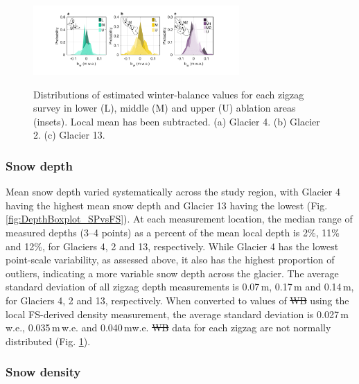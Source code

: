 \documentclass[review,oneside, letterpaper]{igs} %
\providecommand{\DIFadd}[1]{{\protect\color{blue}\uwave{#1}}} %
\providecommand{\DIFdel}[1]{{\protect\color{red}\sout{#1}}}                      %
\providecommand{\DIFaddbegin}{} %
\providecommand{\DIFaddend}{} %
\providecommand{\DIFdelbegin}{} %
\providecommand{\DIFdelend}{} %
\providecommand{\DIFaddbeginFL}{} %
\providecommand{\DIFaddendFL}{} %
\providecommand{\DIFdelbeginFL}{} %
\providecommand{\DIFdelendFL}{} %
\newcommand{\DIFscaledelfig}{0.5}
\newlength{\DIFdelgraphicswidth} %
\newlength{\DIFdelgraphicsheight} %
\newcommand{\DIFaddincludegraphics}[2][]{{\color{blue}\fbox{\DIFOincludegraphics[#1]{#2}}}} %
\newcommand{\DIFdelincludegraphics}[2][]{%
\sbox{\DIFdelgraphicsbox}{\DIFOincludegraphics[#1]{#2}}%
\settoboxwidth{\DIFdelgraphicswidth}{\DIFdelgraphicsbox} %
\settoboxtotalheight{\DIFdelgraphicsheight}{\DIFdelgraphicsbox} %
\scalebox{\DIFscaledelfig}{%
\parbox[b]{\DIFdelgraphicswidth}{\usebox{\DIFdelgraphicsbox}\\[-\baselineskip] \rule{\DIFdelgraphicswidth}{0em}}\llap{\resizebox{\DIFdelgraphicswidth}{\DIFdelgraphicsheight}{%
\setlength{\unitlength}{\DIFdelgraphicswidth}%
\begin{picture}(1,1)%
\thicklines\linethickness{2pt} %
{\color[rgb]{1,0,0}\put(0,0){\framebox(1,1){}}}%
{\color[rgb]{1,0,0}\put(0,0){\line( 1,1){1}}}%
{\color[rgb]{1,0,0}\put(0,1){\line(1,-1){1}}}%
\end{picture}%
}\hspace*{3pt}}} %
} %
\DeclareRobustCommand{\DIFaddbegin}{\DIFOaddbegin \let\includegraphics\DIFaddincludegraphics} %
\DeclareRobustCommand{\DIFaddend}{\DIFOaddend \let\includegraphics\DIFOincludegraphics} %
\DeclareRobustCommand{\DIFdelbegin}{\DIFOdelbegin \let\includegraphics\DIFdelincludegraphics} %
\DeclareRobustCommand{\DIFdelend}{\DIFOaddend \let\includegraphics\DIFOincludegraphics} %
\DeclareRobustCommand{\DIFaddbeginFL}{\DIFOaddbeginFL \let\includegraphics\DIFaddincludegraphics} %
\DeclareRobustCommand{\DIFaddendFL}{\DIFOaddendFL \let\includegraphics\DIFOincludegraphics} %
\DeclareRobustCommand{\DIFdelbeginFL}{\DIFOdelbeginFL \let\includegraphics\DIFdelincludegraphics} %
\DeclareRobustCommand{\DIFdelendFL}{\DIFOaddendFL \let\includegraphics\DIFOincludegraphics} %
\begin{document}
\begin{figure}
	\centering
	\DIFdelbeginFL %
\DIFdelendFL \DIFaddbeginFL \includegraphics[width =0.7\textwidth]{ZigzagHistogram.pdf}\DIFaddendFL \\
	\caption{Distributions of estimated winter-balance values for each zigzag survey in lower (L), middle (M) and upper (U) ablation areas (insets). Local mean has been subtracted. (a) Glacier 4. (b) Glacier 2. (c) Glacier 13.}
	\label{fig:ZigzagHistogram}
\end{figure}

\subsubsection{Snow depth}
Mean snow depth varied systematically across the study region, with Glacier 4 having the highest mean snow depth and Glacier 13 having the lowest (Fig. \ref{fig:DepthBoxplot_SPvsFS}\DIFaddbegin \DIFadd{a}\DIFaddend ). At each measurement location, the median range of measured depths (3--4 points) as a percent of the mean local depth is 2\%, 11\% and 12\%, for Glaciers 4, 2 and 13, respectively. While Glacier 4 has the lowest point-scale variability, as assessed above, it also has the highest proportion of outliers, indicating a more variable snow depth across the glacier. The average standard deviation of all zigzag depth measurements is 0.07\,m, 0.17\,m and 0.14\,m, for Glaciers 4, 2 and 13, respectively. When converted to values of \DIFdelbegin \DIFdel{WB }\DIFdelend \DIFaddbegin \DIFadd{$b_\mathrm{w}$ }\DIFaddend using the local FS-derived density measurement, the average standard deviation is 0.027\,m\,w.e., 0.035\,m\,w.e. and 0.040\,m\DIFaddbegin \DIFadd{\,}\DIFaddend w.e. \DIFdelbegin \DIFdel{WB }\DIFdelend \DIFaddbegin \DIFadd{Winter-balance }\DIFaddend data for each zigzag are not normally distributed (Fig. \ref{fig:ZigzagHistogram}).

\subsubsection{Snow density}
\end{document}
